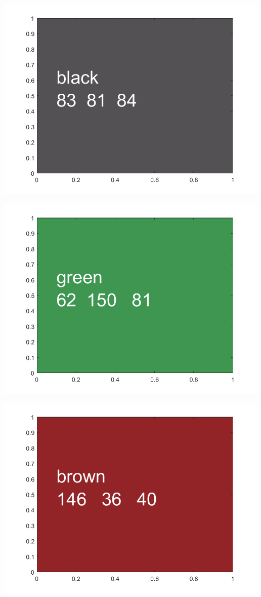 \documentclass[
]{book}
\begin{document}
\includegraphics[width=5.20833in,height=\textheight]{img/fs_color_images/figure_2.png}

\includegraphics[width=5.20833in,height=\textheight]{img/fs_color_images/figure_3.png}

\includegraphics[width=5.20833in,height=\textheight]{img/fs_color_images/figure_4.png}
\end{document}
